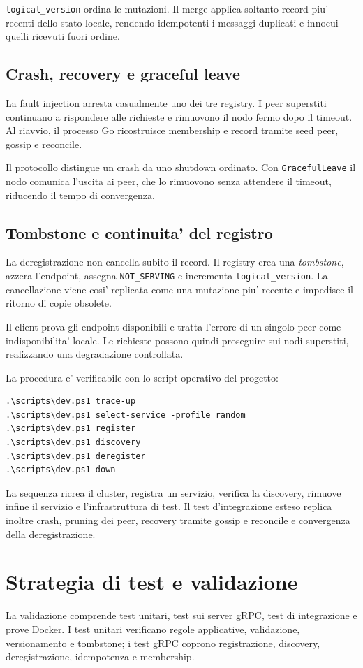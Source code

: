 \documentclass[conference]{IEEEtran}
\begin{document}
\texttt{logical\_version} ordina le mutazioni. Il merge applica soltanto record piu' recenti dello stato locale, rendendo idempotenti i messaggi duplicati e innocui quelli ricevuti fuori ordine.

\subsection{Crash, recovery e graceful leave}
La fault injection arresta casualmente uno dei tre registry. I peer superstiti continuano a rispondere alle richieste e rimuovono il nodo fermo dopo il timeout. Al riavvio, il processo Go ricostruisce membership e record tramite seed peer, gossip e reconcile.

Il protocollo distingue un crash da uno shutdown ordinato. Con \texttt{GracefulLeave} il nodo comunica l'uscita ai peer, che lo rimuovono senza attendere il timeout, riducendo il tempo di convergenza.

\subsection{Tombstone e continuita' del registro}
La deregistrazione non cancella subito il record. Il registry crea una \textit{tombstone}, azzera l'endpoint, assegna \texttt{NOT\_SERVING} e incrementa \texttt{logical\_version}. La cancellazione viene cosi' replicata come una mutazione piu' recente e impedisce il ritorno di copie obsolete.

Il client prova gli endpoint disponibili e tratta l'errore di un singolo peer come indisponibilita' locale. Le richieste possono quindi proseguire sui nodi superstiti, realizzando una degradazione controllata.

La procedura e' verificabile con lo script operativo del progetto:
\begin{verbatim}
.\scripts\dev.ps1 trace-up
.\scripts\dev.ps1 select-service -profile random
.\scripts\dev.ps1 register
.\scripts\dev.ps1 discovery
.\scripts\dev.ps1 deregister
.\scripts\dev.ps1 down
\end{verbatim}
La sequenza ricrea il cluster, registra un servizio, verifica la discovery, rimuove infine il servizio e l'infrastruttura di test. Il test d'integrazione esteso replica inoltre crash, pruning dei peer, recovery tramite gossip e reconcile e convergenza della deregistrazione.

\section{Strategia di test e validazione}
La validazione comprende test unitari, test sui server gRPC, test di integrazione e prove Docker. I test unitari verificano regole applicative, validazione, versionamento e tombstone; i test gRPC coprono registrazione, discovery, deregistrazione, idempotenza e membership.
\end{document}
